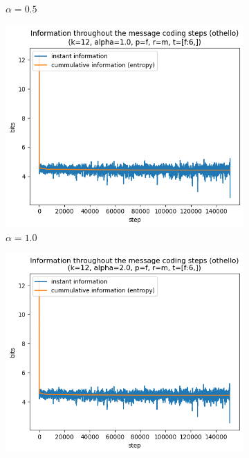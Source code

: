 \documentclass{article}
\begin{document}
\begin{figure}
\begin{subfigure}[b]{0.3\textwidth}
\begin{center}
        \end{center}
        \caption{$\alpha = 0.5$}
        \label{fig:results-alpha-other-0.5}
    \end{subfigure}
    \hfill
    \begin{subfigure}[b]{0.3\textwidth}
        \begin{center}
            \includegraphics[width=1.0\linewidth]{../scripts/images/othello_12_1.0_f_m_[f:6,].png}
        \end{center}
        \caption{$\alpha = 1.0$}
        \label{fig:results-alpha-other-1.0}
    \end{subfigure}
    \begin{subfigure}[b]{0.3\textwidth}
        \begin{center}
            \includegraphics[width=1.0\linewidth]{../scripts/images/othello_12_2.0_f_m_[f:6,].png}

\end{center}
\end{subfigure}
\end{figure}
\end{document}
